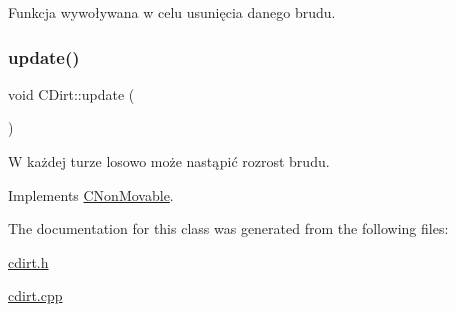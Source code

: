 Funkcja wywoływana w celu usunięcia danego brudu. 

\mbox{\label{class_c_dirt_a0f077e7fde1b397f08659f65d28cf573}} 
\subsubsection{\texorpdfstring{update()}{update()}}
{\footnotesize\ttfamily void C\+Dirt\+::update (\begin{DoxyParamCaption}{ }\end{DoxyParamCaption})\hspace{0.3cm}{\ttfamily [virtual]}}



W każdej turze losowo może nastąpić rozrost brudu. 



Implements \mbox{\hyperlink{class_c_non_movable_ace03bea0246940c6c5c0b26ffa1ef165}{C\+Non\+Movable}}.



The documentation for this class was generated from the following files\+:\begin{DoxyCompactItemize}
\item 
\mbox{\hyperlink{cdirt_8h}{cdirt.\+h}}\item 
\mbox{\hyperlink{cdirt_8cpp}{cdirt.\+cpp}}\end{DoxyCompactItemize}
